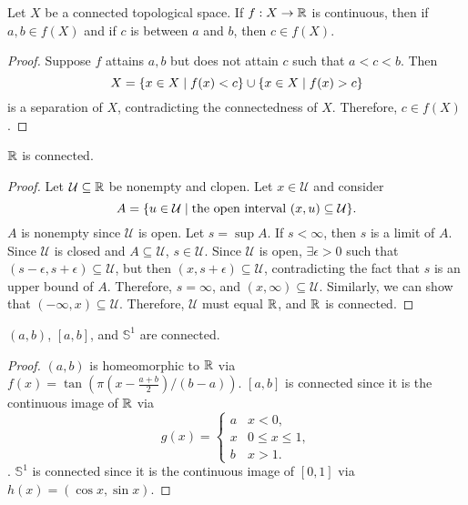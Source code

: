 \begin{cl}
    Let $X$ be a connected topological space. If $f: X \to {\mathbb R}$ is continuous, then if $a, b \in f(X)$ and if $c$ is between $a$ and $b$, then $c \in f(X)$.
    \begin{proof}
        Suppose $f$ attains $a, b$ but does not attain $c$ such that $a < c < b$. Then
        \[
        X = {\left\{{x\in X \mid f(x) < c}\right\}} \cup {\left\{{x\in X \mid f(x) > c}\right\}}
        \]
        is a separation of $X$, contradicting the connectedness of $X$. Therefore, $c \in f(X)$.
    \end{proof}
\end{cl}

\begin{prop}
    ${\mathbb R}$ is connected.
    \begin{proof}
        Let $\mathcal U\subseteq {\mathbb R}$ be nonempty and clopen. Let $x\in \mathcal U$ and consider
        \[
        A = {\left\{{u\in \mathcal U \mid \text{the open interval } (x, u) \subseteq \mathcal U}\right\}}.
        \]
        $A$ is nonempty since $\mathcal U$ is open. Let $s = \sup A$. If $s < \infty$, then $s$ is a limit of $A$. Since $\mathcal U$ is closed and $A\subseteq \mathcal U$, $s\in \mathcal U$. Since $\mathcal U$ is open, $\exists \epsilon > 0$ such that $(s - \epsilon, s + \epsilon) \subseteq \mathcal U$, but then $(x, s + \epsilon) \subseteq \mathcal U$, contradicting the fact that $s$ is an upper bound of $A$. Therefore, $s = \infty$, and $(x, \infty) \subseteq \mathcal U$. Similarly, we can show that $(-\infty, x) \subseteq \mathcal U$. Therefore, $\mathcal U$ must equal ${\mathbb R}$, and ${\mathbb R}$ is connected.
    \end{proof}
\end{prop}

\begin{cl}
    $(a, b)$, $[a, b]$, and $\mathbb S^1$ are connected.
    \begin{proof}
        $(a, b)$ is homeomorphic to ${\mathbb R}$ via $f(x) = \tan(\pi(x - \frac{a+b}{2})/(b-a))$. $[a, b]$ is connected since it is the continuous image of ${\mathbb R}$ via
        \[
        g(x) = \begin{cases}
            a & x < 0, \\
            x & 0 \leq x \leq 1, \\
            b & x > 1.
        \end{cases}
        \]. $\mathbb S^1$ is connected since it is the continuous image of $[0, 1]$ via $h(x) = (\cos x, \sin x)$.
    \end{proof}
\end{cl}

